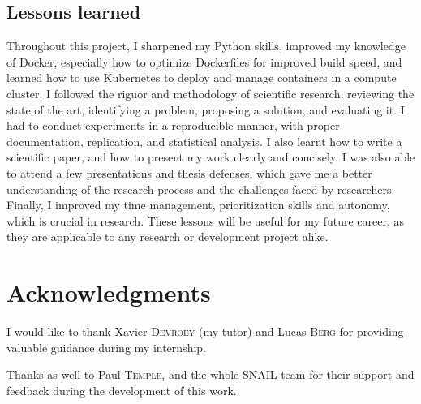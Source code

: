 \documentclass{article}
\newif\ifdetails
\begin{document}
\subsection{Lessons learned}
Throughout this project, I sharpened my Python skills, improved my knowledge of Docker, especially how to optimize Dockerfiles for improved build speed, and learned how to use Kubernetes to deploy and manage containers in a compute cluster.
I followed the riguor and methodology of scientific research, reviewing the state of the art, identifying a problem, proposing a solution, and evaluating it. I had to conduct experiments in a reproducible manner, with proper documentation, replication, and statistical analysis. I also learnt how to write a scientific paper, and how to present my work clearly and concisely.
I was also able to attend a few presentations and thesis defenses, which gave me a better understanding of the research process and the challenges faced by researchers.
Finally, I improved my time management, prioritization skills and autonomy, which is crucial in research.
These lessons will be useful for my future career, as they are applicable to any research or development project alike.
\fi

\section*{Acknowledgments}\label{sec:ack}
I would like to thank Xavier \textsc{Devroey} (my tutor) and Lucas \textsc{Berg} for providing valuable guidance during my internship.

Thanks as well to Paul \textsc{Temple}, and the whole SNAIL team for their support and feedback during the development of this work.

\ifdetails
\section*{Keywords}\label{sec:keywords}
\addcontentsline{toc}{section}{\nameref{sec:keywords}}
\emph{Software Testing, Search-Based Software Testing (SBST), Large Language Models (LLMs), Python, Pynguin, Ollama}
\fi



\newpage
{}  %
\printbibliography{}
\end{document}
